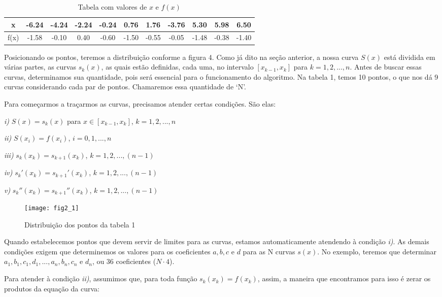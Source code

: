 \documentclass[11pt]{article}
\begin{document}
\begin{table}[!ht]
	\small
	\centering
		\begin{tabular}{|c|c|c|c|c|c|c|c|c|c|c|}
			\hline
			x & -6.24 & -4.24 & -2.24 & -0.24 & 0.76 & 1.76 & -3.76 & 5.30 & 5.98 & 6.50 \\
			\hline
			f(x) & -1.58 & -0.10 & 0.40 & -0.60 & -1.50 & -0.55 & -0.05 & -1.48 & -0.38 & -1.40 \\
			\hline
		\end{tabular}
	\caption{Tabela com valores de $x$ e $f(x)$}
\end{table}

Posicionando os pontos, teremos a distribuição conforme a figura 4.
Como já dito na seção anterior, a nossa curva $S(x)$ está dividida
em várias partes, as curvas $s_k(x)$, as quais estão definidas, cada uma,
no intervalo $[x_{k-1}, x_k]$ para $k = 1, 2, ..., n$. Antes de buscar
essas curvas, determinamos sua quantidade, pois será essencial para o
funcionamento do algoritmo. Na tabela 1, temos 10 pontos, o que nos dá
9 curvas considerando cada par de pontos. Chamaremos essa quantidade de
`N'.

Para começarmos a traçarmos as curvas, precisamos atender certas condições.
São elas:

\textit{i)} $S(x) = s_k(x)$ para $x \in [x_{k-1}, x_k]$, $k = 1, 2, ..., n$

\textit{ii)} $S(x_i) = f(x_i)$, $i = 0, 1, ..., n$

\textit{iii)} $s_k(x_k) = s_{k+1}(x_k)$, $k = 1, 2, ..., (n-1)$

\textit{iv)} $s_k'(x_k) = s_{k+1}'(x_k)$, $k = 1, 2, ..., (n-1)$

\textit{v)} $s_k''(x_k) = s_{k+1}''(x_k)$, $k = 1, 2, ..., (n-1)$

\begin{figure}[h]
\caption{Distribuição dos pontos da tabela 1}
\texttt{[image: fig2\_1]}
\centering
\end{figure}

Quando estabelecemos pontos que devem servir de limites para as curvas,
estamos automaticamente atendendo à condição \textit{i)}. As demais
condições exigem que determinemos os valores para os coeficientes
$a, b, c$ e $d$ para as N curvas $s(x)$. No exemplo, teremos que
determinar $a_1, b_1, c_1, d_1, ..., a_n, b_n, c_n$ e $d_n$, ou 36
coeficientes ($N \cdot 4$).

Para atender à condição \textit{ii)}, assumimos que, para toda função
$s_k(x_k) = f(x_k)$, assim, a maneira que encontramos para isso é zerar
os produtos da equação da curva:
\end{document}
